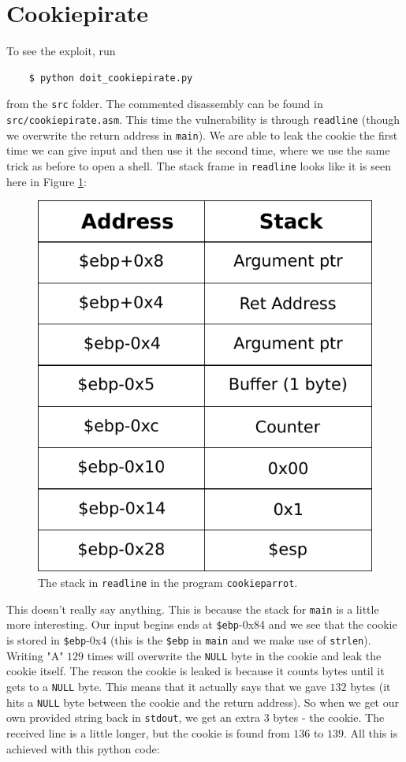 \documentclass[a4paper]{article}
\begin{document}
\section{Cookiepirate}
To see the exploit, run
\begin{verbatim}
    $ python doit_cookiepirate.py
\end{verbatim}
from the \texttt{src} folder. The commented disassembly can be found in \texttt{src/cookiepirate.asm}. This time the vulnerability is through \texttt{readline} (though we overwrite the return address in \texttt{main}). We are able to leak the cookie the first time we can give input and then use it the second time, where we use the same trick as before to open a shell. The stack frame in \texttt{readline} looks like it is seen here in Figure \ref{2}:
\begin{figure}[H]
  \centering
  \includegraphics[scale=0.7]{stack2}
  \caption{The stack in \texttt{readline} in the program \texttt{cookieparrot}.}
  \label{2}
\end{figure}
This doesn't really say anything. This is because the stack for \texttt{main} is a little more interesting. Our input begins ends at \texttt{\$ebp}-0x84 and we see that the cookie is stored in \texttt{\$ebp}-0x4 (this is the \texttt{\$ebp} in \texttt{main} and we make use of \texttt{strlen}). Writing "A" $129$ times will overwrite the \texttt{NULL} byte in the cookie and leak the cookie itself. The reason the cookie is leaked is because it counts bytes until it gets to a \texttt{NULL} byte. This means that it actually says that we gave $132$ bytes (it hits a \texttt{NULL} byte between the cookie and the return address). So when we get our own provided string back in \texttt{stdout}, we get an extra $3$ bytes - the cookie. The received line is a little longer, but the cookie is found from $136$ to $139$. All this is achieved with this python code:
\end{document}
